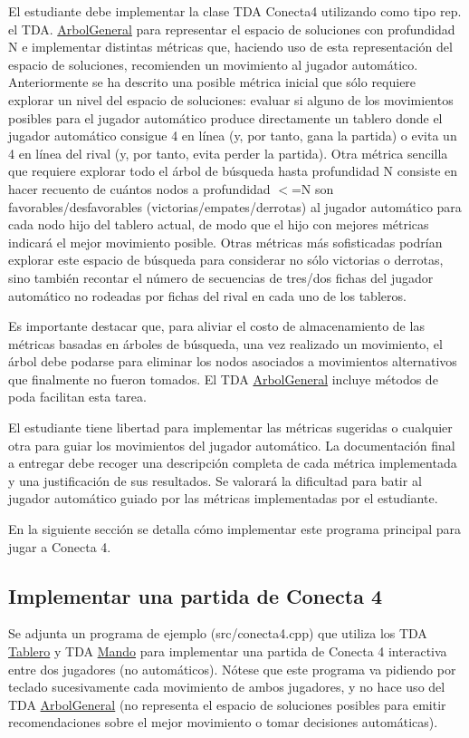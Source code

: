 El estudiante debe implementar la clase T\+DA Conecta4 utilizando como tipo rep. el T\+DA. \hyperlink{classArbolGeneral}{Arbol\+General} para representar el espacio de soluciones con profundidad N e implementar distintas métricas que, haciendo uso de esta representación del espacio de soluciones, recomienden un movimiento al jugador automático. Anteriormente se ha descrito una posible métrica inicial que sólo requiere explorar un nivel del espacio de soluciones\+: evaluar si alguno de los movimientos posibles para el jugador automático produce directamente un tablero donde el jugador automático consigue 4 en línea (y, por tanto, gana la partida) o evita un 4 en línea del rival (y, por tanto, evita perder la partida). Otra métrica sencilla que requiere explorar todo el árbol de búsqueda hasta profundidad N consiste en hacer recuento de cuántos nodos a profundidad $<$=N son favorables/desfavorables (victorias/empates/derrotas) al jugador automático para cada nodo hijo del tablero actual, de modo que el hijo con mejores métricas indicará el mejor movimiento posible. Otras métricas más sofisticadas podrían explorar este espacio de búsqueda para considerar no sólo victorias o derrotas, sino también recontar el número de secuencias de tres/dos fichas del jugador automático no rodeadas por fichas del rival en cada uno de los tableros.

Es importante destacar que, para aliviar el costo de almacenamiento de las métricas basadas en árboles de búsqueda, una vez realizado un movimiento, el árbol debe podarse para eliminar los nodos asociados a movimientos alternativos que finalmente no fueron tomados. El T\+DA \hyperlink{classArbolGeneral}{Arbol\+General} incluye métodos de poda facilitan esta tarea.

El estudiante tiene libertad para implementar las métricas sugeridas o cualquier otra para guiar los movimientos del jugador automático. La documentación final a entregar debe recoger una descripción completa de cada métrica implementada y una justificación de sus resultados. Se valorará la dificultad para batir al jugador automático guiado por las métricas implementadas por el estudiante.

En la siguiente sección se detalla cómo implementar este programa principal para jugar a Conecta 4.\hypertarget{index_partida}{}\subsection{Implementar una partida de Conecta 4}\label{index_partida}
Se adjunta un programa de ejemplo ({\ttfamily src/conecta4.\+cpp}) que utiliza los T\+DA \hyperlink{classTablero}{Tablero} y T\+DA \hyperlink{classMando}{Mando} para implementar una partida de Conecta 4 interactiva entre dos jugadores (no automáticos). Nótese que este programa va pidiendo por teclado sucesivamente cada movimiento de ambos jugadores, y no hace uso del T\+DA \hyperlink{classArbolGeneral}{Arbol\+General} (no representa el espacio de soluciones posibles para emitir recomendaciones sobre el mejor movimiento o tomar decisiones automáticas).


